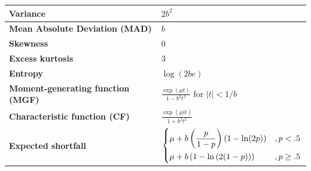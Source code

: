 \begin{customTableWrapper}{2}
\begin{longtable}{|m{6cm}|p{9cm}|}
    \textbf{Variance} &
    $2b^2$
    \\[1ex] \hline

    \textbf{Mean Absolute Deviation (MAD)} &
    $b$
    \\[1ex] \hline

    \textbf{Skewness} &
    $0$
    \\ \hline

    \textbf{Excess kurtosis} &
    $3$
    \\ \hline

    \textbf{Entropy} &
    ${\displaystyle \log(2be)}$
    \\[1ex] \hline

    \textbf{Moment-generating function (MGF)} &
    ${\displaystyle {\frac {\exp(\mu t)}{1-b^{2}t^{2}}}{\text{ for }}|t|<1/b}$
    \\[1ex] \hline

    \textbf{Characteristic function (CF)} &
    ${\displaystyle {\frac {\exp(\mu it)}{1+b^{2}t^{2}}}}$
    \\[1ex] \hline

    \textbf{Expected shortfall} &
    ${\displaystyle {\begin{dcases}\mu +b\left({\frac {p}{1-p}}\right)(1-\ln(2p))&,p<.5\\\mu +b\left(1-\ln \left(2(1-p)\right)\right)&,p\geq .5\end{dcases}}}$
    \\[1ex] \hline

\end{longtable}
\end{customTableWrapper}





















